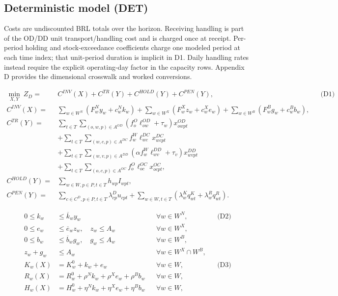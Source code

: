 \documentclass[
  english,
  11pt,
  a4paper,
  authoryear,
  preprint]{elsarticle}
\begin{document}
\subsection{Deterministic model (DET)}\label{deterministic-model-det}

Costs are undiscounted BRL totals over the horizon. Receiving handling
is part of the OD/DD unit transport/handling cost and is charged once at
receipt. Per-period holding and stock-exceedance coefficients charge one
modeled period at each time index; that unit-period duration is implicit
in D1. Daily handling rates instead require the explicit operating-day
factor in the capacity rows. Appendix D provides the dimensional
crosswalk and worked conversions.

\[
\begin{aligned}
\min_{X,Y}\ Z_D={}&C^{INV}(X)+C^{TR}(Y)+C^{HOLD}(Y)+C^{PEN}(Y), &&\text{(D1)}\\
C^{INV}(X)={}&\sum_{w\in W^N}(F^N_wy_w+c^N_wk_w)
 +\sum_{w\in W^X}(F^X_wz_w+c^X_we_w)
 +\sum_{w\in W^B}(F^B_wg_w+c^B_wb_w),\\
C^{TR}(Y)={}&\sum_{t\in T}\sum_{(o,w,p)\in A^{OD}}
 (f^O_o\ell^{OD}_{ow}+\tau_w)x^{OD}_{owpt}\\
&+\sum_{t\in T}\sum_{(w,c,p)\in A^{DC}}f^W_w\ell^{DC}_{wc}x^{DC}_{wcpt}\\
&+\sum_{t\in T}\sum_{(w,v,p)\in A^{DD}}
 (\alpha f^W_w\ell^{DD}_{wv}+\tau_v)x^{DD}_{wvpt}\\
&+\sum_{t\in T}\sum_{(o,c,p)\in A^{OC}}f^O_o\ell^{OC}_{oc}x^{OC}_{ocpt},\\
C^{HOLD}(Y)={}&\sum_{w\in W,p\in P,t\in T}h_{wp}I_{wpt},\\
C^{PEN}(Y)={}&\sum_{c\in C^D,p\in P,t\in T}\lambda^D_{cp}u_{cpt}
 +\sum_{w\in W,t\in T}(\lambda^K_wq^K_{wt}+\lambda^R_wq^R_{wt}).
\end{aligned}
\]

\[
\begin{aligned}
0\le k_w&\le\overline k_wy_w &&\forall w\in W^N, &&\text{(D2)}\\
0\le e_w&\le\overline e_wz_w,\quad z_w\le A_w &&\forall w\in W^X,\\
0\le b_w&\le\overline b_wg_w,\quad g_w\le A_w &&\forall w\in W^B,\\
z_w+g_w&\le A_w &&\forall w\in W^X\cap W^B,\\
K_w(X)&=K^0_w+k_w+e_w &&\forall w\in W, &&\text{(D3)}\\
R_w(X)&=R^0_w+\rho^Nk_w+\rho^Xe_w+\rho^Bb_w &&\forall w\in W,\\
H_w(X)&=H^0_w+\eta^Nk_w+\eta^Xe_w+\eta^Bb_w &&\forall w\in W,
\end{aligned}
\]
\end{document}
